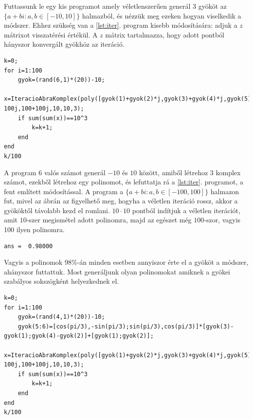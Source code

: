 \documentclass[a4paper,12pt]{report}
\begin{document}
Futtassunk le egy kis programot amely véletlenszerűen generál 3 gyököt az $\{ a+bi : a,b \in [-10,10]\}$ halmazból, és nézzük meg ezeken hogyan viselkedik a módszer. Ehhez szükség van a \ref{lst:iter}. program kisebb módosítására: adjuk a $z$ mátrixot visszatérési értékül. A $z$ mátrix tartalmazza, hogy adott pontból hányszor konvergált gyökhöz az iteráció.
                \begin{singlespace}
                \begin{lstlisting}[caption=Bemenet,label=lst:szabalyos]
k=0;
for i=1:100
    gyok=(rand(6,1)*(20))-10;
    x=IteracioAbraKomplex(poly([gyok(1)+gyok(2)*j,gyok(3)+gyok(4)*j,gyok(5)+gyok(6)*j]),-100-100j,100+100j,10,10,3);
    if sum(sum(x))==10^3
        k=k+1;
    end
end
k/100
                \end{lstlisting}
                \end{singlespace}
A program $6$ valós számot generál $-10$ és $10$ között, amiből létrehoz $3$ komplex számot, ezekből létrehoz egy polinomot, és lefuttatja rá a \ref{lst:iter}. programot, a fent említett módosítással. A program a $\{a+bi:a,b\in[-100,100]\}$ halmazon fut, mivel az ábrán az figyelhető meg, hogyha a véletlen iteráció rossz, akkor a gyököktől távolabb kezd el romlani. $10\cdot 10$ pontból indítjuk a véletlen iterációt, amit $10$-szer megismétel adott polinomra, majd az egészet még $100$-szor, vagyis 100 ilyen polinomra.
                \begin{singlespace}
                \begin{lstlisting}[caption=Eredm\'eny]
ans =  0.98000
                \end{lstlisting}
                \end{singlespace}
Vagyis a polinomok 98\%-án minden esetben annyiszor érte el a gyököt a módszer, ahányszor futtattuk. Most generáljunk olyan polinomokat amiknek a gyökei szabályos sokszögként helyezkednek el.
                \begin{singlespace}
                \begin{lstlisting}[caption=Bemenet]
k=0;
for i=1:100
    gyok=(rand(4,1)*(20))-10;
    gyok(5:6)=[cos(pi/3),-sin(pi/3);sin(pi/3),cos(pi/3)]*[gyok(3)-gyok(1);gyok(4)-gyok(2)]+[gyok(1);gyok(2)];
    x=IteracioAbraKomplex(poly([gyok(1)+gyok(2)*j,gyok(3)+gyok(4)*j,gyok(5)+gyok(6)*j]),-100-100j,100+100j,10,10,3);
    if sum(sum(x))==10^3
        k=k+1;
    end
end
k/100
                \end{lstlisting}
                \end{singlespace}
\end{document}
